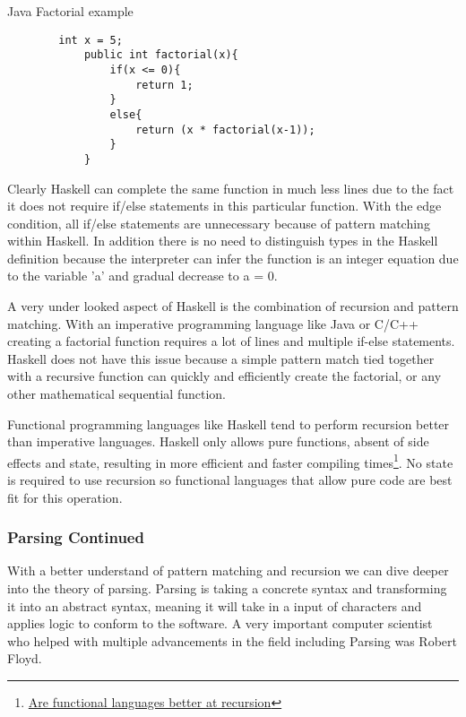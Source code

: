 \documentclass{article}
\begin{document}
        \medskip
        \caption{Java Factorial example}
        \begin{lstlisting}
        int x = 5;
            public int factorial(x){
                if(x <= 0){
                    return 1;
                }
                else{
                    return (x * factorial(x-1));
                }
            }
        \end{lstlisting}
        Clearly Haskell can complete the same function in much less lines due to the fact it does not require if/else statements in this particular function. With the edge condition, all if/else statements are unnecessary because of pattern matching within Haskell. In addition there is no need to distinguish types in the Haskell definition because the interpreter can infer the function is an integer equation due to the variable 'a' and gradual decrease to a = 0.
        
        \medskip
        \noindent A very under looked aspect of Haskell is the combination of recursion and pattern matching. With an imperative programming language like Java or C/C++ creating a factorial function requires a lot of lines and multiple if-else statements. Haskell does not have this issue because a simple pattern match tied together with a recursive function can quickly and efficiently create the factorial, or any other mathematical sequential function.
        
        \medskip
        \noindent Functional programming languages like Haskell tend to perform recursion better than imperative languages. Haskell only allows pure functions, absent of side effects and state, resulting in more efficient and faster compiling times\footnote{\href{https://softwareengineering.stackexchange.com/questions/149167/are-functional-languages-better-at-recursion}{Are functional languages better at recursion}}. No state is required to use recursion so functional languages that allow pure code are best fit for this operation.
        
        
        \subsubsection{Parsing Continued}
        With a better understand of pattern matching and recursion we can dive deeper into the theory of parsing. Parsing is taking a concrete syntax and transforming it into an abstract syntax, meaning it will take in a input of characters and applies logic to conform to the software. A very important computer scientist who helped with multiple advancements in the field including Parsing was Robert Floyd.
    
\end{document}
